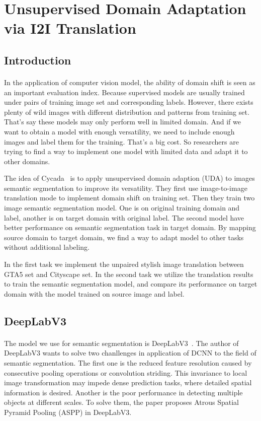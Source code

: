 \section{Unsupervised Domain Adaptation via I2I Translation}
\subsection{Introduction}
\paragraph{}
In the application of computer vision model, the ability of domain shift is seen as an important evaluation index. Because supervised models are usually trained under pairs of training image set and corresponding labels. However, there exists plenty of wild images with different distribution and patterns from training set. That's say these models may only perform well in limited domain. And if we want to obtain a model with enough versatility, we need to include enough images and label them for the training. That's a big cost. So researchers are trying to find a way to implement one model with limited data and adapt it to other domains.

The idea of Cycada~\cite{cycada} is to apply unsupervised domain adaption (UDA) to images semantic segmentation to improve its versatility. They first use image-to-image translation mode to implement domain shift on training set. Then they train two image semantic segmentation model. One is on original training domain and label, another is on target domain with original label. The second model have better performance on semantic segmentation task in target domain. By mapping source domain to target domain, we find a way to adapt model to other tasks without additional labeling.

In the first task we implement the unpaired stylish image translation between GTA5 set and Cityscape set. In the second task we utilize the translation results to train the semantic segmentation model, and compare its performance on target domain with the model trained on source image and label. 

\subsection{DeepLabV3}
\paragraph{}
The model we use for semantic segmentation is DeepLabV3~\cite{2017Rethinking}. The author of DeepLabV3 wants to solve two chanllenges in application of DCNN to the field of semantic segmentation. The first one is the reduced feature resolution caused by consecutive pooling operations or convolution striding. This invariance to local image transformation may impede dense prediction tasks, where detailed spatial information is desired. Another is the poor performance in detecting multiple objects at different scales. To solve them, the paper proposes Atrous Spatial Pyramid Pooling (ASPP) in DeepLabV3.

